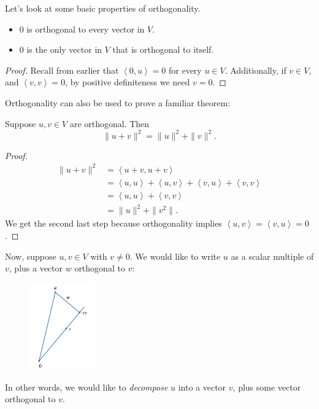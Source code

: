 \documentclass[math0540-lecture-notes.tex]{subfiles}
\begin{document}
Let's look at some basic properties of orthogonality.
\begin{proposition}{}
  \begin{itemize}
    \item $0$ is orthogonal to every vector in $V$.
    \item $0$ is the only vector in $V$ that is orthogonal to itself.
  \end{itemize}
\end{proposition}
\begin{proof}[Proof]
  Recall from earlier that $\left<0,u \right> =0$ for every $u\in V$. Additionally, if $v\in V$,
  and $\left<v,v \right> =0$, by positive definiteness we need $v=0$.
\end{proof}

Orthogonality can also be used to prove a familiar theorem:
\begin{theorem}{}
  Suppose $u,v\in V$ are orthogonal. Then \[
    \|u+v\|^2=\|u\|^2+\|v\|^2
  .\] 
\end{theorem}
\begin{proof}[Proof]
  \begin{align*}
    \|u+v\|^2&= \left<u+v,u+v \right> \\
             &= \left<u,u \right> +\left<u,v \right>+\left<v,u \right>+\left<v,v \right>\\
             &= \left<u,u \right>+\left<v,v \right> \\
             &=\|u\|^2+\|v^2\|
  .\end{align*}
  We get the second last step because orthogonality implies $\left<u,v \right> = \left<v,u \right> =
  0$.
\end{proof}

Now, suppose $u,v\in V$ with $v\neq 0$. We would like to write $u$ as a scalar multiple of $v$, plus
a vector $w$ orthogonal to $v$:
\begin{figure}[htpb]
  \centering
  \includegraphics[width=0.25\textwidth]{axler6adecomp.png}
\end{figure}
In other words, we would like to \textit{decompose} $u$ into a vector $v$, plus some vector
orthogonal to $v$.
\end{document}
